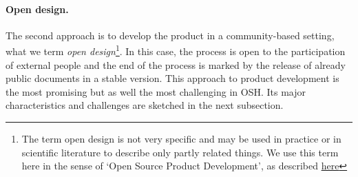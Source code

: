\documentclass{article}
\begin{document}
\paragraph{Open design.}The second approach is to develop the product in a community-based setting, what we term \emph{open design}\footnote{The term open design is not very specific and may be used in practice or in scientific literature to describe only partly related things. We use this term here in the sense of `Open Source Product Development', as described \href{https://opensourcedesign.cc/wiki/index.php/Open_Source_Product_Development}{here}}. In this case, the process is open to the participation of external people and the end of the process is marked by the release of already public documents in a stable version. This approach to product development is the most promising but as well the most challenging in OSH. Its major characteristics and challenges are sketched in the next subsection.
\end{document}
